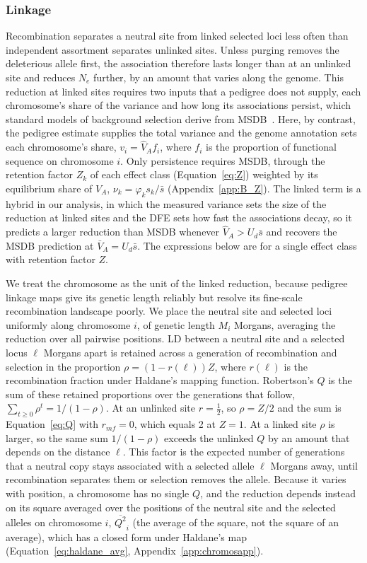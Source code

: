 \documentclass{article}
\begin{document}
\subsubsection{Linkage}\label{sec:linkage}
Recombination separates a neutral site from linked selected loci less often than independent assortment separates unlinked sites. Unless purging removes the deleterious allele first, the association therefore lasts longer than at an unlinked site and reduces $N_e$ further, by an amount that varies along the genome. This reduction at linked sites requires two inputs that a pedigree does not supply, each chromosome's share of the variance and how long its associations persist, which standard models of background selection derive from MSDB~\cite{murphy2023,buffaloKern2024,marsh2026}. Here, by contrast, the pedigree estimate supplies the total variance and the genome annotation sets each chromosome's share, $v_i = \hat{V}_A f_i$, where $f_i$ is the proportion of functional sequence on chromosome $i$. Only persistence requires MSDB, through the retention factor $Z_k$ of each effect class (Equation~\eqref{eq:Z}) weighted by its equilibrium share of $V_A$, $\nu_k = \varphi_ks_k/\bar{s}$ (Appendix~\ref{app:B_Z}). The linked term is a hybrid in our analysis, in which the measured variance sets the size of the reduction at linked sites and the DFE sets how fast the associations decay, so it predicts a larger reduction than MSDB whenever $\hat{V}_A > U_d\bar{s}$ and recovers the MSDB prediction at $\bar{V}_A = U_d\bar{s}$. The expressions below are for a single effect class with retention factor $Z$.

We treat the chromosome as the unit of the linked reduction, because pedigree linkage maps give its genetic length reliably but resolve its fine-scale recombination landscape poorly. We place the neutral site and selected loci uniformly along chromosome $i$, of genetic length $M_i$ Morgans, averaging the reduction over all pairwise positions. LD between a neutral site and a selected locus $\ell$ Morgans apart is retained across a generation of recombination and selection in the proportion $\rho = (1 - r(\ell))Z$, where $r(\ell)$ is the recombination fraction under Haldane's mapping function. Robertson's $Q$ is the sum of these retained proportions over the generations that follow, $\sum_{t \ge 0}\rho^t = 1/(1-\rho)$. At an unlinked site $r = \tfrac12$, so $\rho = Z/2$ and the sum is Equation~\eqref{eq:Q} with $r_{mf} = 0$, which equals 2 at $Z = 1$. At a linked site $\rho$ is larger, so the same sum $1/(1-\rho)$ exceeds the unlinked $Q$ by an amount that depends on the distance $\ell$. This factor is the expected number of generations that a neutral copy stays associated with a selected allele $\ell$ Morgans away, until recombination separates them or selection removes the allele. Because it varies with position, a chromosome has no single $Q$, and the reduction depends instead on its square averaged over the positions of the neutral site and the selected alleles on chromosome $i$, $\overline{Q^2}_i$ (the average of the square, not the square of an average), which has a closed form under Haldane's map (Equation~\eqref{eq:haldane_avg}, Appendix~\ref{app:chromosapp}).
\end{document}
